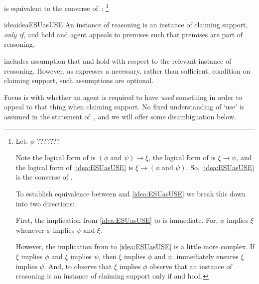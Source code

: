 \begin{note}
  \ESU{} is equivalent to the converse of~\USE{}:\nolinebreak
  \footnote{
    Let:
    \(\phi\) {\color{red}???????}


    Note the logical form of \USE{} is \((\phi \text{ and } \psi) \rightarrow \xi\), the logical form of \ESU{} is \(\xi \rightarrow \psi\), and the logical form of \autoref{idea:ESUasUSE} is \(\xi \rightarrow (\phi \text{ and } \psi)\).
    So, \autoref{idea:ESUasUSE} is the converse of \USE{}.

    To establish equivalence between \ESU{} and \autoref{idea:ESUasUSE} we break this down into two directions:

    First, the implication from \autoref{idea:ESUasUSE} to \ESU{} is immediate.
    For, \(\phi\) implies \(\xi\) whenever \(\phi\) implies \(\psi \text{ and } \xi\).

    However, the implication from \ESU{} to \autoref{idea:ESUasUSE} is a little more complex.
    If \(\xi\) implies \(\phi\) and \(\xi\) implies \(\psi\), then \(\xi\) implies \(\phi \text{ and } \psi\).
    \ESU{} immediately ensures \(\xi\) implies \(\psi\).
    And, to observe that \(\xi\) implies \(\phi\) observe that an instance of reasoning is an instance of claiming support only if \ideaS{} and \ideaCS{} hold.
  }

  \begin{restatable}[]{idea}{ideaESUasUSE}
    \label{idea:ESUasUSE}
    An instance of reasoning is an instance of claiming support, \emph{only if}, \ideaS{} and \ideaCS{} hold and agent appeals to premises such that premises are part of reasoning.
  \end{restatable}

\end{note}

\begin{note}
  \USE{} includes assumption that \ideaS{} and \ideaCS{} hold with respect to the relevant instance of reasoning.
  However, as \ESU{} expresses a necessary, rather than sufficient, condition on claiming support, such assumptions are optional.
\end{note}

\begin{note}
  Focus is with whether an agent is required to have \emph{used} something in order to appeal to that thing when claiming support.
  No fixed understanding of `use' is assumed in the statement of~\ESU{}, and we will offer some disambiguation below.
\end{note}

